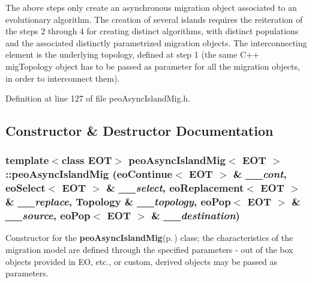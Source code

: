 The above steps only create an asynchronous migration object associated to an evolutionary algorithm. The creation of several islands requires the reiteration of the steps 2 through 4 for creating distinct algorithms, with distinct populations and the associated distinctly parametrized migration objects. The interconnecting element is the underlying topology, defined at step 1 (the same C++ mig\-Topology object has to be passed as parameter for all the migration objects, in order to interconnect them). 



Definition at line 127 of file peo\-Async\-Island\-Mig.h.

\subsection{Constructor \& Destructor Documentation}
\subsubsection{\setlength{\rightskip}{0pt plus 5cm}template$<$class EOT$>$ {\bf peo\-Async\-Island\-Mig}$<$ EOT $>$::{\bf peo\-Async\-Island\-Mig} (eo\-Continue$<$ EOT $>$ \& {\em \_\-\_\-cont}, eo\-Select$<$ EOT $>$ \& {\em \_\-\_\-select}, eo\-Replacement$<$ EOT $>$ \& {\em \_\-\_\-replace}, {\bf Topology} \& {\em \_\-\_\-topology}, eo\-Pop$<$ EOT $>$ \& {\em \_\-\_\-source}, eo\-Pop$<$ EOT $>$ \& {\em \_\-\_\-destination})}\label{classpeo_async_island_mig_e0f706cbf4148d3ca327227a5c7a9fdf}


Constructor for the {\bf peo\-Async\-Island\-Mig}{\rm (p.\,\pageref{classpeo_async_island_mig})} class; the characteristics of the migration model are defined through the specified parameters - out of the box objects provided in EO, etc., or custom, derived objects may be passed as parameters. 

